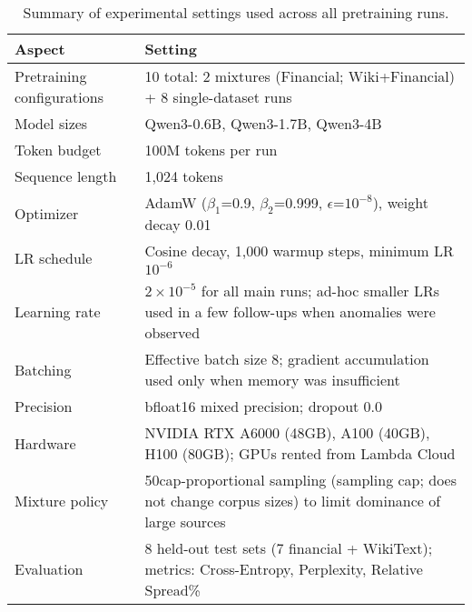 \begin{table}[htbp]
\centering
\caption[Experimental Settings Summary]{Summary of experimental settings used across all pretraining runs.}
\label{tab:exp_settings}
\small
\begin{tabular}{p{3.8cm} p{9.5cm}}
\toprule
\textbf{Aspect} & \textbf{Setting} \\
\midrule
Pretraining configurations & 10 total: 2 mixtures (Financial; Wiki+Financial) + 8 single-dataset runs \\
Model sizes & Qwen3-0.6B, Qwen3-1.7B, Qwen3-4B \\
Token budget & 100M tokens per run \\
Sequence length & 1{,}024 tokens \\
Optimizer & AdamW ($\beta_1$=0.9, $\beta_2$=0.999, $\epsilon$=$10^{-8}$), weight decay 0.01 \\
LR schedule & Cosine decay, 1{,}000 warmup steps, minimum LR $10^{-6}$ \\
Learning rate & $2\times10^{-5}$ for all main runs; ad-hoc smaller LRs used in a few follow-ups when anomalies were observed \\
Batching & Effective batch size 8; gradient accumulation used only when memory was insufficient \\
Precision & bfloat16 mixed precision; dropout 0.0 \\
Hardware & NVIDIA RTX A6000 (48GB), A100 (40GB), H100 (80GB); GPUs rented from Lambda Cloud\footnotemark{} \\
Mixture policy & 50cap-proportional sampling (sampling cap; does not change corpus sizes) to limit dominance of large sources \\
Evaluation & 8 held-out test sets (7 financial + WikiText); metrics: Cross-Entropy, Perplexity, Relative Spread\% \\
\bottomrule
\end{tabular}
\end{table}
